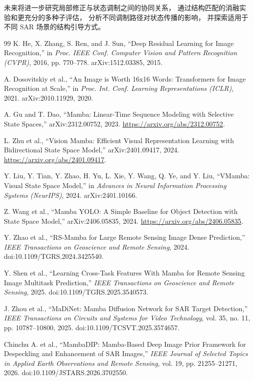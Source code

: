 \documentclass[journal]{IEEEtran}
\begin{document}
未来将进一步研究局部修正与状态调制之间的协同关系，
通过结构匹配的消融实验和更充分的多种子评估，
分析不同调制路径对状态传播的影响，
并探索适用于不同 SAR 场景的结构引导方式。

\begin{thebibliography}{99}
K. He, X. Zhang, S. Ren, and J. Sun, ``Deep Residual Learning for Image Recognition,'' in \emph{Proc. IEEE Conf. Computer Vision and Pattern Recognition (CVPR)}, 2016, pp. 770--778. arXiv:1512.03385, 2015.

A. Dosovitskiy et al., ``An Image is Worth 16x16 Words: Transformers for Image Recognition at Scale,'' in \emph{Proc. Int. Conf. Learning Representations (ICLR)}, 2021. arXiv:2010.11929, 2020.

A. Gu and T. Dao, ``Mamba: Linear-Time Sequence Modeling with Selective State Spaces,'' arXiv:2312.00752, 2023. \url{https://arxiv.org/abs/2312.00752}.

L. Zhu et al., ``Vision Mamba: Efficient Visual Representation Learning with Bidirectional State Space Model,'' arXiv:2401.09417, 2024. \url{https://arxiv.org/abs/2401.09417}.

Y. Liu, Y. Tian, Y. Zhao, H. Yu, L. Xie, Y. Wang, Q. Ye, and Y. Liu, ``VMamba: Visual State Space Model,'' in \emph{Advances in Neural Information Processing Systems (NeurIPS)}, 2024. arXiv:2401.10166.

Z. Wang et al., ``Mamba YOLO: A Simple Baseline for Object Detection with State Space Model,'' arXiv:2406.05835, 2024. \url{https://arxiv.org/abs/2406.05835}.

Y. Zhao et al., ``RS-Mamba for Large Remote Sensing Image Dense Prediction,'' \emph{IEEE Transactions on Geoscience and Remote Sensing}, 2024. doi:10.1109/TGRS.2024.3425540.

Y. Shen et al., ``Learning Cross-Task Features With Mamba for Remote Sensing Image Multitask Prediction,'' \emph{IEEE Transactions on Geoscience and Remote Sensing}, 2025. doi:10.1109/TGRS.2025.3540573.

J. Zhou et al., ``MaDiNet: Mamba Diffusion Network for SAR Target Detection,'' \emph{IEEE Transactions on Circuits and Systems for Video Technology}, vol. 35, no. 11, pp. 10787--10800, 2025. doi:10.1109/TCSVT.2025.3574657.

Chinchu A. et al., ``MambaDIP: Mamba-Based Deep Image Prior Framework for Despeckling and Enhancement of SAR Images,'' \emph{IEEE Journal of Selected Topics in Applied Earth Observations and Remote Sensing}, vol. 19, pp. 21255--21271, 2026. doi:10.1109/JSTARS.2026.3702550.


\end{thebibliography}
\end{document}

